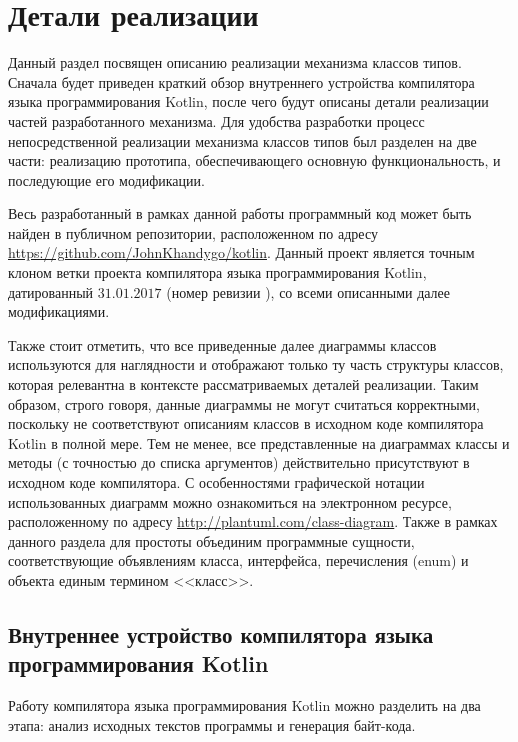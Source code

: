 \chapter{Детали реализации}

Данный раздел посвящен описанию реализации механизма классов типов. Сначала будет приведен краткий обзор внутреннего устройства компилятора языка программирования Kotlin, после чего будут описаны детали реализации частей разработанного механизма. Для удобства разработки процесс непосредственной реализации механизма классов типов был разделен на две части: реализацию прототипа, обеспечивающего основную функциональность, и последующие его модификации. 

Весь разработанный в рамках данной работы программный код может быть найден в публичном репозитории, расположенном по адресу \url{https://github.com/JohnKhandygo/kotlin}. Данный проект является точным клоном ветки  проекта компилятора языка программирования Kotlin, датированный $31.01.2017$ (номер ревизии ), со всеми описанными далее модификациями. 

Также стоит отметить, что все приведенные далее диаграммы классов используются для наглядности и отображают только ту часть структуры классов, которая релевантна в контексте рассматриваемых деталей реализации. Таким образом, строго говоря, данные диаграммы не могут считаться корректными, поскольку не соответствуют описаниям классов в исходном коде компилятора Kotlin в полной мере. Тем не менее, все представленные на диаграммах классы и методы (с точностью до списка аргументов) действительно присутствуют в исходном коде компилятора. С особенностями графической нотации использованных диаграмм можно ознакомиться на электронном ресурсе, расположенному по адресу \url{http://plantuml.com/class-diagram}. Также в рамках данного раздела для простоты объединим программные сущности, соответствующие объявлениям класса, интерфейса, перечисления (enum) и объекта единым термином <<класс>>.  

\section{Внутреннее устройство компилятора языка программирования Kotlin}

Работу компилятора языка программирования Kotlin можно разделить на два этапа: анализ исходных текстов программы и генерация байт-кода. 

